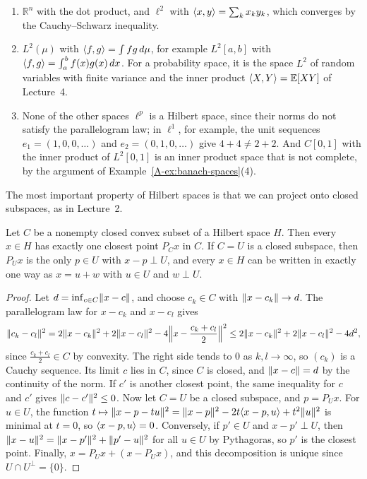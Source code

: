 \begin{example}\label{A-ex:hilbert-spaces}
    \begin{enumerate}
        \item $\mathbb{R}^n$ with the dot product, and $\ell^2$ with $\langle x, y \rangle = \sum_k x_ky_k$, which converges by the Cauchy--Schwarz inequality.
        \item $L^2(\mu)$ with $\langle f, g \rangle = \int fg\, d\mu$, for example $L^2[a, b]$ with $\langle f, g \rangle = \int_a^b f(x)g(x)\, dx$. For a probability space, it is the space $L^2$ of random variables with finite variance and the inner product $\langle X, Y \rangle = \mathbb{E}[XY]$ of Lecture~4.
        \item None of the other spaces $\ell^p$ is a Hilbert space, since their norms do not satisfy the parallelogram law; in $\ell^1$, for example, the unit sequences $e_1 = (1, 0, 0, \ldots)$ and $e_2 = (0, 1, 0, \ldots)$ give $4 + 4 \neq 2 + 2$. And $C[0, 1]$ with the inner product of $L^2[0, 1]$ is an inner product space that is not complete, by the argument of Example~\ref{A-ex:banach-spaces}(4).
    \end{enumerate}
\end{example}

The most important property of Hilbert spaces is that we can project onto closed subspaces, as in Lecture~2.

\begin{theorem}\label{A-thm:projection}
    Let $C$ be a nonempty closed convex subset of a Hilbert space $H$. Then every $x \in H$ has exactly one closest point $P_Cx$ in $C$. If $C = U$ is a closed subspace, then $P_Ux$ is the only $p \in U$ with $x - p \perp U$, and every $x \in H$ can be written in exactly one way as $x = u + w$ with $u \in U$ and $w \perp U$.
\end{theorem}

\begin{proof}
    Let $d = \inf_{c \in C}\lVert x - c \rVert$, and choose $c_k \in C$ with $\lVert x - c_k \rVert \to d$. The parallelogram law for $x - c_k$ and $x - c_l$ gives
    \[\lVert c_k - c_l \rVert^2 = 2\lVert x - c_k \rVert^2 + 2\lVert x - c_l \rVert^2 - 4\Big\|x - \frac{c_k + c_l}{2}\Big\|^2 \leq 2\lVert x - c_k \rVert^2 + 2\lVert x - c_l \rVert^2 - 4d^2,\]
    since $\frac{c_k + c_l}{2} \in C$ by convexity. The right side tends to $0$ as $k, l \to \infty$, so $(c_k)$ is a Cauchy sequence. Its limit $c$ lies in $C$, since $C$ is closed, and $\lVert x - c \rVert = d$ by the continuity of the norm. If $c'$ is another closest point, the same inequality for $c$ and $c'$ gives $\lVert c - c' \rVert^2 \leq 0$. Now let $C = U$ be a closed subspace, and $p = P_Ux$. For $u \in U$, the function $t \mapsto \lVert x - p - tu \rVert^2 = \lVert x - p \rVert^2 - 2t\langle x - p, u \rangle + t^2\lVert u \rVert^2$ is minimal at $t = 0$, so $\langle x - p, u \rangle = 0$. Conversely, if $p' \in U$ and $x - p' \perp U$, then $\lVert x - u \rVert^2 = \lVert x - p' \rVert^2 + \lVert p' - u \rVert^2$ for all $u \in U$ by Pythagoras, so $p'$ is the closest point. Finally, $x = P_Ux + (x - P_Ux)$, and this decomposition is unique since $U \cap U^\perp = \{0\}$.
\end{proof}

